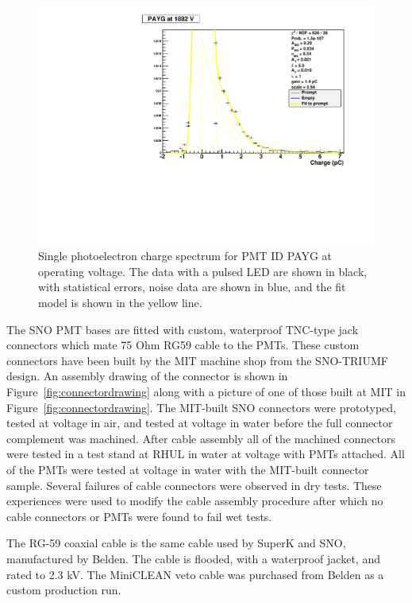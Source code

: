 \documentclass{JINST}
\begin{document}
\begin{figure}[ht]
\begin{center}
\includegraphics[width=4.5in]{graphics/PAYG_singlePE.pdf}
\caption{Single photoelectron charge spectrum for PMT ID PAYG at operating voltage.  The data with a pulsed LED are shown in black, with statistical errors, noise data are shown in blue, and the fit model is shown in the yellow line.
\label{fig:pmt_spe_q}}
\end{center}
\end{figure}

The SNO PMT bases are fitted with custom, waterproof TNC-type jack
connectors which mate 75 Ohm RG59 cable to the PMTs.  These custom
connectors have been built by the MIT machine shop from the SNO-TRIUMF
design. An assembly drawing of the connector is shown in
Figure~\ref{fig:connectordrawing} along with a picture of one of those
built at MIT in Figure~\ref{fig:connectordrawing}. The MIT-built SNO
connectors were prototyped, tested at voltage in air, and tested at
voltage in water before the full connector complement was machined.
After cable assembly all of the machined connectors were tested in
a test stand at RHUL in water at voltage with PMTs attached.  All of the
PMTs were tested at voltage in water with the MIT-built connector
sample.  Several failures of cable connectors were observed in dry
tests.  These experiences were used to modify the cable assembly
procedure after which no cable connectors or PMTs were found to fail
wet tests.


The RG-59 coaxial cable is the same cable used by SuperK and SNO,
manufactured by Belden.  The cable is flooded, with a waterproof
jacket, and rated to 2.3 kV.  The MiniCLEAN veto cable was purchased
from Belden as a custom production run.  
\end{document}
